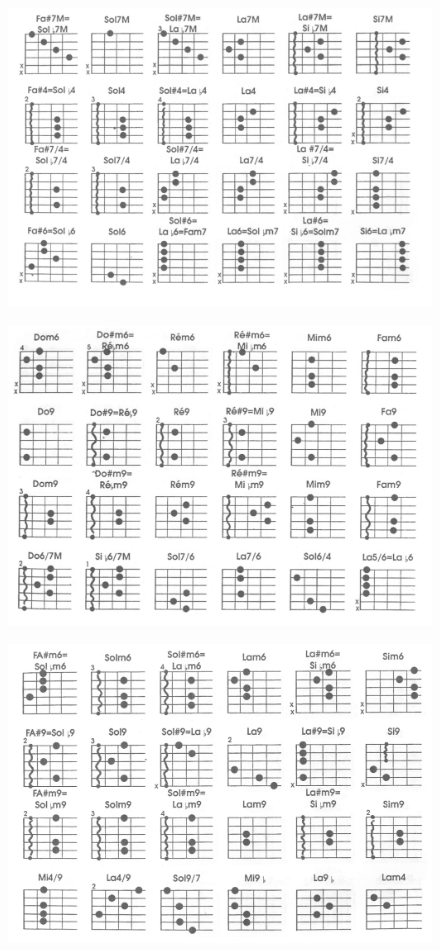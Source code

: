 \documentclass[9pt]{article}
\begin{document}
\begin{figure}[ht!]
    \centering
    \includegraphics[width=.95\linewidth]{photos_accords/accords_4.png}
\end{figure}
\begin{figure}[ht!]
    \centering
    \includegraphics[width=.95\linewidth]{photos_accords/accords_5.png}
\end{figure}
\begin{figure}[ht!]
    \centering
    \includegraphics[width=.95\linewidth]{photos_accords/accords_6.png}
\end{figure}
\end{document}
